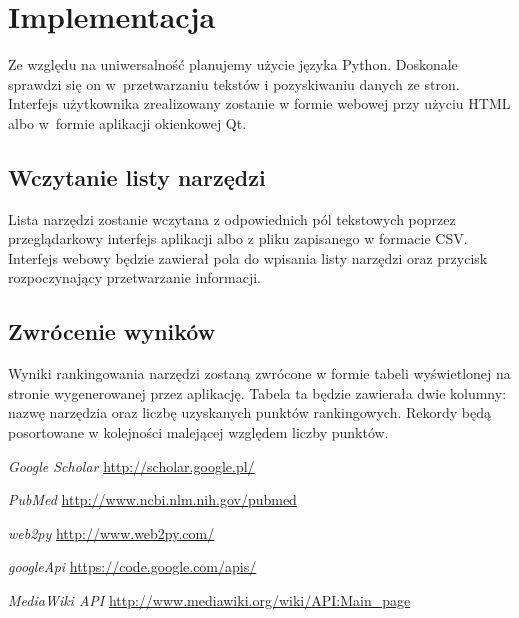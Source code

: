 \documentclass[11pt,a4paper]{article}
\begin{document}
\section{Implementacja}
Ze względu na uniwersalność planujemy użycie języka Python. Doskonale sprawdzi się on w~przetwarzaniu tekstów i pozyskiwaniu danych ze stron. Interfejs użytkownika zrealizowany zostanie w formie webowej przy użyciu {H}{T}{M}{L} albo w~formie aplikacji okienkowej Qt.

\subsection{Wczytanie listy narzędzi}
Lista narzędzi zostanie wczytana z odpowiednich pól tekstowych poprzez przeglądarkowy interfejs aplikacji albo z pliku zapisanego w formacie CSV. Interfejs webowy będzie zawierał pola do wpisania listy narzędzi oraz przycisk rozpoczynający przetwarzanie informacji.

\subsection{Zwrócenie wyników}
Wyniki rankingowania narzędzi zostaną zwrócone w formie tabeli wyświetlonej na stronie wygenerowanej przez aplikację. Tabela ta będzie zawierała dwie kolumny: nazwę narzędzia oraz liczbę uzyskanych punktów rankingowych. Rekordy będą posortowane w kolejności malejącej względem liczby punktów.

\begin{thebibliography}{9}
  \emph{Google Scholar}
  \url{http://scholar.google.pl/}

  \emph{PubMed}
  \url{http://www.ncbi.nlm.nih.gov/pubmed}

  \emph{web2py}
  \url{http://www.web2py.com/}

  \emph{googleApi}
  \url{https://code.google.com/apis/}

  \emph{MediaWiki API}
  \url{http://www.mediawiki.org/wiki/API:Main_page}

\end{thebibliography}
\end{document}

